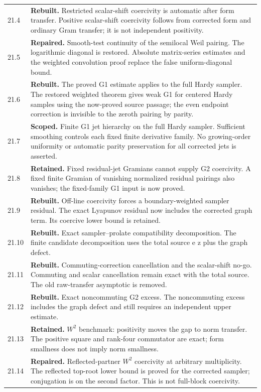 \documentclass[11pt]{article}
\theoremstyle{remark}
\begin{document}
\begin{longtable}{@{}p{}p{}@{}}
21.4 & \textbf{Rebuilt.} Restricted scalar-shift coercivity is automatic after form transfer. Positive scalar-shift coercivity follows from corrected form and ordinary Gram transfer; it is not independent positivity. \\[4pt]
21.5 & \textbf{Repaired.} Smooth-test continuity of the semilocal Weil pairing. The logarithmic diagonal is restored. Absolute matrix-series estimates and the weighted convolution proof replace the false uniform-diagonal bound. \\[4pt]
21.6 & \textbf{Rebuilt.} The proved G1 estimate applies to the full Hardy sampler. The restored weighted theorem gives weak G1 for centered Hardy samples using the now-proved source passage; the even endpoint correction is invisible to the zeroth pairing by parity. \\[4pt]
21.7 & \textbf{Scoped.} Finite G1 jet hierarchy on the full Hardy sampler. Sufficient smoothing controls each fixed finite derivative family. No growing-order uniformity or automatic parity preservation for all corrected jets is asserted. \\[4pt]
21.8 & \textbf{Retained.} Fixed residual-jet Gramians cannot supply G2 coercivity. A fixed finite Gramian of vanishing normalized residual pairings also vanishes; the fixed-family G1 input is now proved. \\[4pt]
21.9 & \textbf{Rebuilt.} Off-line coercivity forces a boundary-weighted sampler residual. The exact Lyapunov residual now includes the corrected graph term. Its coercive lower bound is retained. \\[4pt]
21.10 & \textbf{Rebuilt.} Exact sampler--prolate compatibility decomposition. The finite candidate decomposition uses the total source e z plus the graph defect. \\[4pt]
21.11 & \textbf{Rebuilt.} Commuting-correction cancellation and the scalar-shift no-go. Commuting and scalar cancellation remain exact with the total source. The old raw-transfer asymptotic is removed. \\[4pt]
21.12 & \textbf{Rebuilt.} Exact noncommuting G2 excess. The noncommuting excess includes the graph defect and still requires an independent upper estimate. \\[4pt]
21.13 & \textbf{Retained.} $W^2$ benchmark: positivity moves the gap to norm transfer. The positive square and rank-four commutator are exact; form smallness does not imply norm smallness. \\[4pt]
21.14 & \textbf{Repaired.} Reflected-partner $W^2$ coercivity at arbitrary multiplicity. The reflected top-root lower bound is proved for the corrected sampler; conjugation is on the second factor. This is not full-block coercivity. \\[4pt]

\end{longtable}
\end{document}
